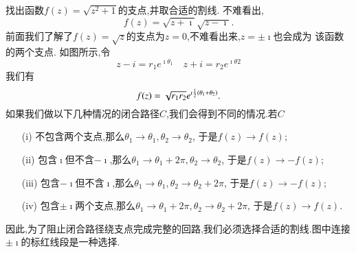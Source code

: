 \begin{examplebox}{找出函数$f(z) = \sqrt{z^2 + 1}$的支点,并取合适的割线.}
不难看出,
\[
  f(z) = \sqrt{z + \imath} \sqrt{z-\imath} .
\]
前面我们了解了$f(z)=\sqrt{z}$的支点为$z=0$,不难看出来,$z=\pm \imath$也会成为
该函数的两个支点.
如图所示,令
\[ z - i = r_1 e^{\imath \theta_1 } \quad 
    z + i = r_2 e^{\imath \theta 2}
\]
我们有\[f(z) = \sqrt{r_1 r_2} e^{\imath {\frac{1}{2}} (\theta_1 + \theta_2)}.\]
如果我们做以下几种情况的闭合路径$C$,我们会得到不同的情况.若$C$
\begin{enumerate}
    \item[(i)] 不包含两个支点,那么$\theta_1 \to \theta_1, \theta_2 \to \theta_2$, 于是$f(z)\to f(z)$;
    \item[(ii)] 包含$\imath$但不含$-\imath$,那么$\theta_1 \to \theta_1 + 2\pi, \theta_2 \to \theta_2$, 于是$f(z)\to - f(z)$;
    \item[(iii)] 包含$-\imath$但不含$\imath$,那么$\theta_1 \to \theta_1, \theta_2 \to \theta_2  + 2\pi$, 于是$f(z)\to - f(z)$;
    \item[(iv)] 包含$\pm \imath$两个支点,那么$\theta_1 \to \theta_1  + 2\pi, \theta_2 \to \theta_2  + 2\pi$, 于是$f(z)\to  f(z)$.
\end{enumerate}
    \centering
    
因此,为了阻止闭合路径绕支点完成完整的回路,我们必须选择合适的割线.图中连接$\pm \imath$的标红线段是一种选择.
\end{examplebox}